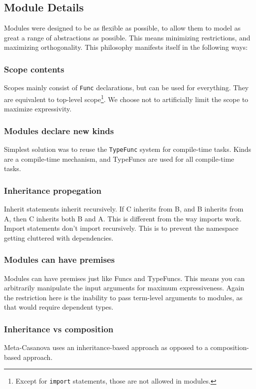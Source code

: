\subsection{Module Details}
Modules were designed to be as flexible as possible, to allow them to model as great a range of abstractions as possible.
This means minimizing restrictions, and maximizing orthogonality.
This philosophy manifests itself in the following ways:

\subsubsection*{Scope contents}
Scopes mainly consist of \texttt{Func} declarations, but can be used for everything.
They are equivalent to top-level scope\footnote{Except for \texttt{import} statements, those are not allowed in modules.}. 
We choose not to artificially limit the scope to maximize expressivity.

\subsubsection*{Modules declare new kinds}
Simplest solution was to reuse the \texttt{TypeFunc} system for compile-time tasks.
Kinds are a compile-time mechanism, and TypeFuncs are used for all compile-time tasks.

\subsubsection*{Inheritance propegation}
Inherit statements inherit recursively.
If C inherits from B, and B inherits from A, then C inherits both B and A.
This is different from the way imports work.
Import statements don't import recursively.
This is to prevent the namespace getting cluttered with dependencies.

\subsubsection*{Modules can have premises}
Modules can have premises just like Funcs and TypeFuncs.
This means you can arbitrarily manipulate the input arguments for maximum expressiveness.
Again the restriction here is the inability to pass term-level arguments to modules, as that would require dependent types.

\subsubsection*{Inheritance vs composition}
Meta-Casanova uses an inheritance-based approach as opposed to a composition-based approach.

